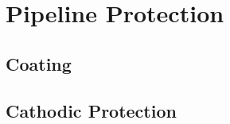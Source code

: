 
\chapter{Pipeline Protection}\label{ch:pipeline-protection}


\section{Coating}






\section{Cathodic Protection}







